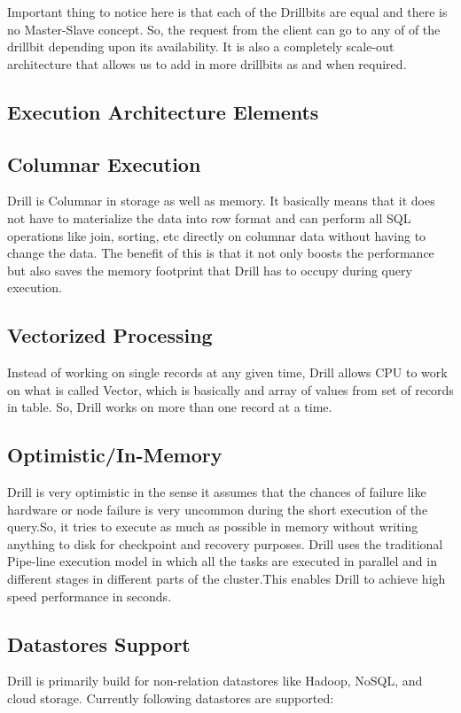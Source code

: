 \documentclass[9pt,twocolumn,twoside]{styles/osajnl}
\begin{document}
Important thing to notice here is that each of the Drillbits are equal and there is no Master-Slave concept. So, the request from the client can go to any of of the drillbit depending upon its availability. It is also a completely scale-out architecture that allows us to add in more drillbits as and when required\cite{Query-Execution}.

\subsection{Execution Architecture Elements}
\subsection{Columnar Execution}
Drill is Columnar in storage as well as memory. It basically means that it does not have to materialize the data into row format and can perform all SQL operations like join, sorting, etc directly on columnar data  without having to change the data. The benefit of this is that it not only boosts the performance but also saves the memory footprint that Drill has to occupy during query execution.

\subsection{Vectorized Processing}
Instead of working on single records at any given time, Drill allows CPU to work on what is called Vector, which is basically and array of values from set of records in table. So, Drill works on more than one record at a time.

\subsection*{Optimistic/In-Memory}
Drill is very optimistic in the sense it assumes that the chances of failure like hardware or node failure is very uncommon during the short execution of the query.So, it tries to execute as much as possible in memory without writing anything to disk for checkpoint and recovery purposes. Drill uses the traditional Pipe-line execution model in which all the tasks are executed in parallel and in different stages in different parts of the cluster.This enables Drill to achieve high speed performance in seconds.

\subsection{Datastores Support}
Drill is primarily build for non-relation datastores like Hadoop, NoSQL, and cloud storage.
Currently following datastores are supported:
\end{document}
